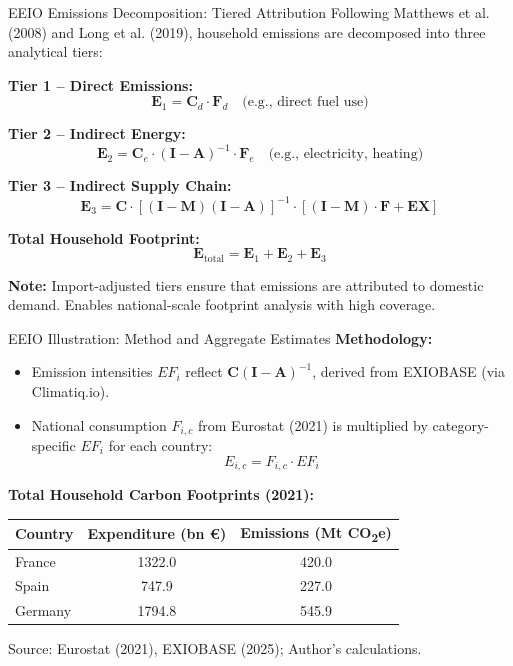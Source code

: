 \documentclass{beamer}
\begin{document}
\begin{frame}{EEIO Emissions Decomposition: Tiered Attribution}
\footnotesize
\vspace{-2.0em}
Following Matthews et al. (2008) and Long et al. (2019), household emissions are decomposed into three analytical tiers:

\vspace{0.5em}
\textbf{Tier 1 – Direct Emissions:}
\[
\mathbf{E}_1 = \mathbf{C}_d \cdot \mathbf{F}_d
\quad \text{(e.g., direct fuel use)}
\]

\textbf{Tier 2 – Indirect Energy:}
\[
\mathbf{E}_2 = \mathbf{C}_e \cdot (\mathbf{I} - \mathbf{A})^{-1} \cdot \mathbf{F}_e
\quad \text{(e.g., electricity, heating)}
\]

\textbf{Tier 3 – Indirect Supply Chain:}
\[
\mathbf{E}_3 = \mathbf{C} \cdot \left[(\mathbf{I} - \mathbf{M})(\mathbf{I} - \mathbf{A})\right]^{-1} \cdot \left[(\mathbf{I} - \mathbf{M}) \cdot \mathbf{F} + \mathbf{EX}\right]
\]

\vspace{0.5em}
\textbf{Total Household Footprint:}
\[
\mathbf{E}_{\text{total}} = \mathbf{E}_1 + \mathbf{E}_2 + \mathbf{E}_3
\]

\vspace{0.5em}
\textbf{Note:}  
Import-adjusted tiers ensure that emissions are attributed to domestic demand. Enables national-scale footprint analysis with high coverage.

\end{frame}

\begin{frame}{EEIO Illustration: Method and Aggregate Estimates}
\vspace{-2.0em}
  \footnotesize
\textbf{Methodology:}
\begin{itemize}
  \item Emission intensities \(EF_i\) reflect \( \mathbf{C}(\mathbf{I}-\mathbf{A})^{-1} \), derived from EXIOBASE (via Climatiq.io).
  \item National consumption \(F_{i,c}\) from Eurostat (2021) is multiplied by category-specific \(EF_i\) for each country:
  \[
  E_{i,c} = F_{i,c} \cdot EF_i
  \]
  \end{itemize}

\vspace{0.6em}
\textbf{Total Household Carbon Footprints (2021):}

\begin{table}[h]
\footnotesize
\begin{tabular}{lcc}
\toprule
\textbf{Country} & \textbf{Expenditure (bn €)} & \textbf{Emissions (Mt CO\textsubscript{2}e)} \\
\midrule
France   & 1322.0 & 420.0 \\
Spain    & 747.9  & 227.0 \\
Germany  & 1794.8 & 545.9 \\
\bottomrule
\end{tabular}
\end{table}

\vspace{0.3em}
\footnotesize Source: Eurostat (2021), EXIOBASE (2025); Author’s calculations.
\end{frame}
\end{document}

